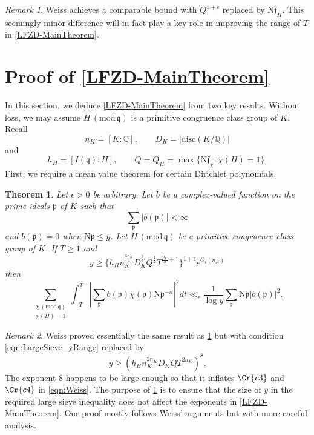 \documentclass[12pt,psamsfonts]{amsart}
\newtheorem{thm}{Theorem}[section]
\theoremstyle{definition}
\theoremstyle{remark}
\numberwithin{equation}{section}
\theoremstyle{plain}
\theoremstyle{remark}
\newtheorem*{remark}{Remark}
\renewcommand{\1}{ {\bf 1}}
\newcommand{\kf}{\mathfrak{f}}
\renewcommand{\pmod}[1]{\, (\mathrm{mod} {\, #1})}
\newcommand{\N}{\mathrm{N}}
\newcommand{\kp}{\mathfrak{p}}
\newcommand{\kq}{\mathfrak{q}}
\newcommand{\Q}{\mathbb{Q}}
\begin{document}
\begin{remark}
Weiss \cite[Lemma 1.16]{Weiss} achieves a comparable bound with $Q^{1+\epsilon}$ replaced by $\mathrm{N}\kf_H$.  This seemingly minor difference will in fact play a key role in improving the range of $T$ in \cref{LFZD-MainTheorem}.
\end{remark}

\section{Proof of \cref{LFZD-MainTheorem}}
\label{sec:LFZD_Proof}

In this section, we deduce \cref{LFZD-MainTheorem} from two key results. Without loss, we may assume $H \pmod{\kq}$ is a primitive congruence class group of $K$. Recall
\[
n_K = [K:\Q], \qquad D_K = |\mathrm{disc}(K/\Q)|
\]
and
\[
h_H = [I(\kq):H], \qquad Q = Q_H = \max\{ \N\kf_{\chi} : \chi(H) = 1\}.
\]
First, we require a mean value theorem for certain Dirichlet polynomials.

\begin{thm} \label{thm:LargeSieve}
Let $\epsilon > 0$ be arbitrary.  Let $b$ be a complex-valued function on the prime ideals $\kp$ of $K$ such that
\[
\sum_{\kp}|b(\kp)|<\infty
\]
and $b(\kp)=0$ when $\N\kp\leq y$.  Let $H \pmod{\kq}$ be a primitive congruence class group of $K$.  If $T\geq1$ and
\begin{equation}
y\geq \big\{ h_H n_K^{\tfrac{5n_K}{4}} D_K^{\tfrac{3}{2}} Q^{\tfrac{1}{2}} T^{\tfrac{n_K}{2}+1}  \big\}^{1+\epsilon} e^{O_{\epsilon}(n_K)}
\label{eqn:LargeSieve_yRange}
\end{equation}
then
\[
\sum_{\substack{\chi \pmod{\kq} \\ \chi(H)=1}}\int_{-T}^{T}\left|\sum_{\kp}b(\kp)\chi(\kp)\N\kp^{-it}\right|^2 dt\ll_{\epsilon} \frac{1}{\log y}\sum_{\kp}\N\kp|b(\kp)|^2.
\]
\end{thm} 
\begin{remark}
Weiss proved essentially the same result \cite[Corollary 3.8]{Weiss} as \cref{thm:LargeSieve} but with condition \eqref{eqn:LargeSieve_yRange} replaced by
\[
y \geq (h_H n_K^{2 n_K} D_K Q T^{2n_K})^8. 
\] 
The exponent 8 happens to be large enough so that it inflates $\Cr{c3}$ and $\Cr{c4}$ in \eqref{eqn:Weiss}.  The purpose of \cref{thm:LargeSieve} is to ensure that the size of $y$ in the required large sieve inequality does not affect the exponents in \cref{LFZD-MainTheorem}.  Our proof mostly follows Weiss' arguments but with more careful analysis.
\end{remark}
\end{document}
